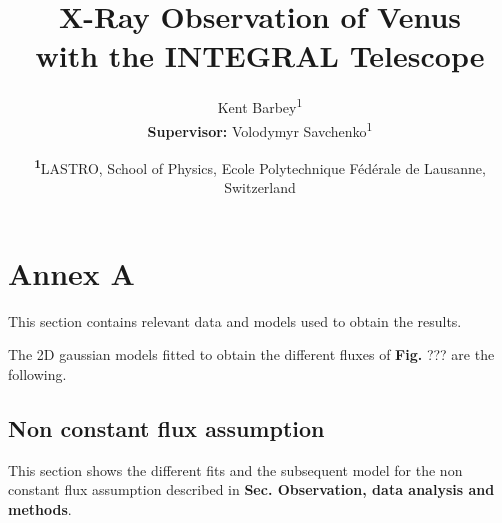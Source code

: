 \documentclass[
	a4paper, %
	10pt, %
	unnumberedsections, %
	twoside, %
]{LTJournalArticle}
\title{X-Ray Observation of Venus\\ with the INTEGRAL Telescope} %
\author{%
	Kent Barbey\textsuperscript{1} \\ \textbf{Supervisor:} Volodymyr Savchenko\textsuperscript{1}
}
\date{\footnotesize\textsuperscript{\textbf{1}}LASTRO, School of Physics, Ecole Polytechnique Fédérale de Lausanne, Switzerland}
\begin{document}
\maketitle %
\tableofcontents















\section{Annex A}
This section contains relevant data and models used to obtain the results.

The 2D gaussian models fitted to obtain the different fluxes of \textbf{Fig.} ??? are the following.
\subsection{Non constant flux assumption}
This section shows the different fits and the subsequent model for the non constant flux assumption described in \textbf{Sec. Observation, data analysis and methods}.
\end{document}
